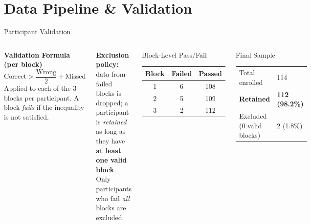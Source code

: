 \documentclass[aspectratio=169, 10pt]{beamer}
\begin{document}
\section{Data Pipeline \& Validation}

\begin{frame}{Participant Validation}
  \begin{columns}[T]
      \textbf{Validation Formula (per block)}
      \[
        \text{Correct} > \frac{\text{Wrong}}{2} + \text{Missed}
      \]
      \vspace{0.3em}
      Applied to each of the 3 blocks per participant. A block \emph{fails} if the inequality is not satisfied.

      \vspace{0.5em}
      \textbf{Exclusion policy:} data from failed blocks is dropped; a participant is \emph{retained} as long as they have \textbf{at least one valid block}. Only participants who fail \emph{all} blocks are excluded.

      \begin{block}{Block-Level Pass/Fail}
        \begin{tabular}{ccc}
          \toprule
          Block & Failed & Passed \\
          \midrule
          1 & 6  & 108 \\
          2 & 5  & 109 \\
          3 & 2  & 112 \\
          \bottomrule
        \end{tabular}
      \end{block}
      \begin{exampleblock}{Final Sample}
        \begin{tabular}{ll}
          Total enrolled   & 114 \\
          \textbf{Retained} & \textbf{112 (98.2\%)} \\
          Excluded (0 valid blocks) & 2 (1.8\%)  \\
        \end{tabular}
      \end{exampleblock}
  \end{columns}
\end{frame}
\end{document}
